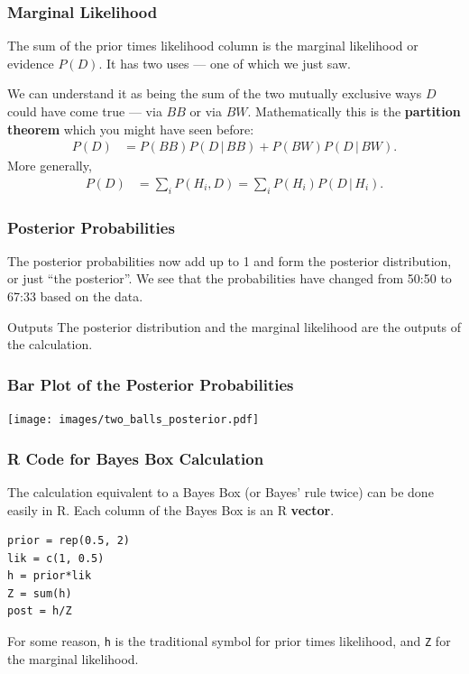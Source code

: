 \documentclass{beamer}
\newcommand{\given}{\,|\,}
\begin{document}
\begin{frame}
\frametitle{Marginal Likelihood}
The sum of the prior times likelihood column is the marginal likelihood
or evidence $P(D)$. It has two uses --- one of which we just saw.\\[0.5em]\pause

We can understand it as being the sum of the two mutually exclusive ways
$D$ could have come true --- via $BB$ or via $BW$. Mathematically this is
the {\bf partition theorem} which you might have seen before:
\begin{align}
P(D) &= P(BB)P(D \given BB) + P(BW)P(D \given BW).
\end{align}
\pause
More generally,
\begin{align}
P(D) &= \sum_i P(H_i, D) = \sum_i P(H_i)P(D \given H_i).
\end{align}

\end{frame}


\begin{frame}
\frametitle{Posterior Probabilities}
The posterior probabilities now add up to 1 and form the posterior distribution,
or just ``the posterior''. We see that the probabilities have changed from
50:50 to 67:33 based on the data.\pause

\begin{alertblock}{Outputs}
The posterior distribution and the marginal likelihood are the outputs of the
calculation.
\end{alertblock}

\end{frame}

\begin{frame}
\frametitle{Bar Plot of the Posterior Probabilities}

\centering
\texttt{[image: images/two\_balls\_posterior.pdf]}

\end{frame}


\begin{frame}[fragile]
\frametitle{R Code for Bayes Box Calculation}
The calculation equivalent to a Bayes Box (or Bayes' rule twice) can be
done easily in R. Each column of the Bayes Box is an R {\bf vector}.\pause

\begin{verbatim}
prior = rep(0.5, 2)
lik = c(1, 0.5)
h = prior*lik
Z = sum(h)
post = h/Z
\end{verbatim}
\pause
For some reason, \texttt{h} is the traditional symbol for prior times
likelihood, and \texttt{Z} for the marginal likelihood.
\end{frame}
\end{document}
